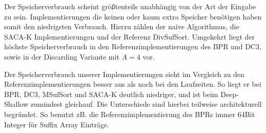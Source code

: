 Der Speicherverbrauch scheint größtenteils unabhängig von der Art der Eingabe zu sein. Implementierungen die keinen oder kaum extra Speicher benötigen haben somit den niedrigsten Verbrauch. Hierzu zählen der naive Algorithmus, die SACA-K Implementierungen und der Referenz DivSufSort. Umgekehrt liegt der höchste Speicherverbrauch in den Referenzimplementierungen des BPR und DC3, sowie in der Discarding Variante mit $A=4$ vor.

Der Speicherverbrauch unserer Implementierungen sieht im Vergleich zu den Referenzimplementierungen besser aus als noch bei den Laufzeiten. So liegt er bei BPR, DC3, MSufSort und SACA-K deutlich niedriger, und ist beim Deep-Shallow zumindest gleichauf. Die Unterschiede sind hierbei teilweise architekturell begründet. So benutzt zB. die Referenzimplementierung des BPRs immer 64Bit Integer für Suffix Array Einträge.

\newpage

